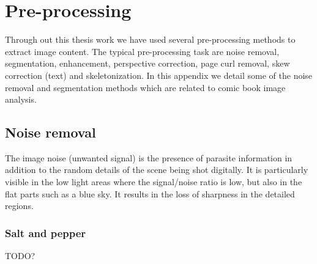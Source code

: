 \chapter{Pre-processing}
\label{app:pre-processing}
\graphicspath{{./chapters/Appendix/figs/}}


Through out this thesis work we have used several pre-processing methods to extract image content.
The typical pre-processing task are noise removal, segmentation, enhancement, perspective correction, page curl removal, skew correction (text) and skeletonization.
In this appendix we detail some of the noise removal and segmentation methods which are related to comic book image analysis.




\section*{Noise removal} %
\label{sub:ap:noise_removal}
The image noise (unwanted signal) is the presence of parasite information in addition to the random details of the scene being shot digitally.
It is particularly visible in the low light areas where the signal/noise ratio is low, but also in the flat parts such as a blue sky.
It results in the loss of sharpness in the detailed regions.

\subsection*{Salt and pepper} %
\label{sub:salt_and_paper}
TODO?

